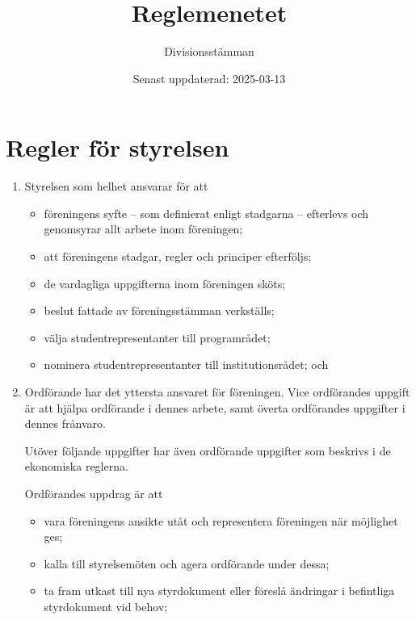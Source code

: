 \documentclass{dvd}
\begin{document}
\title{Reglemenetet}
\author{Divisionsstämman}
\date{Senast uppdaterad: 2025-03-13}

\section{Regler för styrelsen}

\begin{enumerate}[label=\arabic* §, ref=\arabic*]
	\item Styrelsen som helhet ansvarar för att
	      \begin{itemize}
		      \item föreningens syfte -- som definierat enligt stadgarna -- efterlevs och genomsyrar allt arbete inom föreningen;

		      \item att föreningens stadgar, regler och principer efterföljs;

		      \item de vardagliga uppgifterna inom föreningen sköts;

		      \item beslut fattade av föreningsstämman verkställs;

		      \item välja studentrepresentanter till programrådet;

		      \item nominera studentrepresentanter till institutionsrådet; och
	      \end{itemize}

	\item Ordförande har det yttersta ansvaret för föreningen.
	      Vice ordförandes uppgift är att hjälpa ordförande i dennes arbete, samt överta ordförandes uppgifter i dennes frånvaro.

	      Utöver följande uppgifter har även ordförande uppgifter som beskrivs i de ekonomiska reglerna.

	      Ordförandes uppdrag är att
	      \begin{itemize}
		      \item vara föreningens ansikte utåt och representera föreningen när möjlighet ges;

		      \item kalla till styrelsemöten och agera ordförande under dessa;

		      \item ta fram utkast till nya styrdokument eller föreslå ändringar i befintliga styrdokument vid behov;


\end{itemize}
\end{enumerate}
\end{document}
